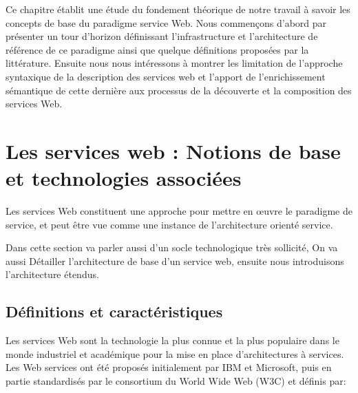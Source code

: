 

    Ce chapitre établit une étude du fondement théorique de notre travail à savoir les concepts de base du paradigme
    service Web.  Nous commençons d'abord par présenter un tour d'horizon définissant l'infrastructure et
    l'architecture de référence de ce paradigme ainsi que quelque définitions proposées par la littérature. Ensuite
    nous nous intéressons à montrer les limitation de l'approche syntaxique de la description des services web et l'apport
    de l'enrichissement sémantique de cette dernière aux processus de la découverte et la composition des services Web.\\

    \newpage
    
\section{Les services web : Notions de base et technologies associées} 
    Les services Web constituent une approche pour mettre en œuvre le paradigme de service, et peut être vue comme
    une instance de l'architecture orienté service.

    Dans cette section va parler aussi d'un socle technologique très sollicité, On va aussi Détailler l'architecture de base 
    d'un service web, ensuite nous introduisons l'architecture étendus.

    \subsection{Définitions et caractéristiques}
	Les services Web sont la technologie la plus connue et la plus populaire dans le monde industriel et
	académique pour la mise en place d’architectures à services. Les Web services ont été proposés initialement par
	IBM et Microsoft, puis en partie standardisés par le consortium du World Wide Web (W3C) et définis
       	\cite{w3c_ws_arch:2014:Misc} par:

